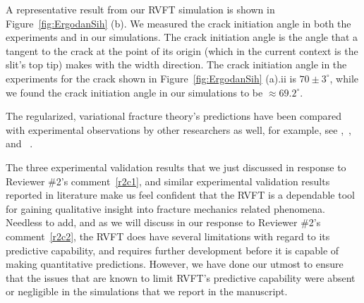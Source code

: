 \documentclass[11pt,letterpaper]{report}
\begin{document}
\begin{enumerate}[label=\textit{2.\arabic*},wide, labelwidth=!, labelindent=0pt]
A representative result from our RVFT simulation is shown in Figure~\ref{fig:ErgodanSih} (b). %
We measured the crack initiation angle in both the experiments and in our simulations. %
The crack initiation angle is the angle that a tangent to the crack at the point of its origin (which in the current context is the slit's top tip) makes with the width direction. %
The crack initiation angle in the experiments for  the crack shown in Figure~\ref{fig:ErgodanSih} (a).ii is $70 \pm 3^{\circ}$, while 
we found the crack initiation angle in our simulations to be $\approx 69.2^{\circ}$. %




The regularized, variational fracture theory's  predictions have been compared with experimental observations by other researchers as well, for example, see \cite{mesgarnejad2015validation},~\cite{miehe2010phase}, and ~\cite{wu2017phase}. %


The three experimental validation results that we just discussed in response to Reviewer \#2's comment~\ref{r2c1}, and similar experimental validation results reported in literature make us feel confident that the  RVFT is a dependable tool for gaining qualitative insight into fracture mechanics related phenomena. %
Needless to add, and as we will discuss in our response to Reviewer \#2's comment~\ref{r2c2}, the RVFT does have several limitations with regard to its predictive capability, and requires further development before it is capable of making quantitative predictions. %
However, we have done our utmost to ensure that the issues that are known to limit RVFT's predictive capability were absent or negligible in the  simulations that we report in the manuscript. %


\end{enumerate}
\end{document}
